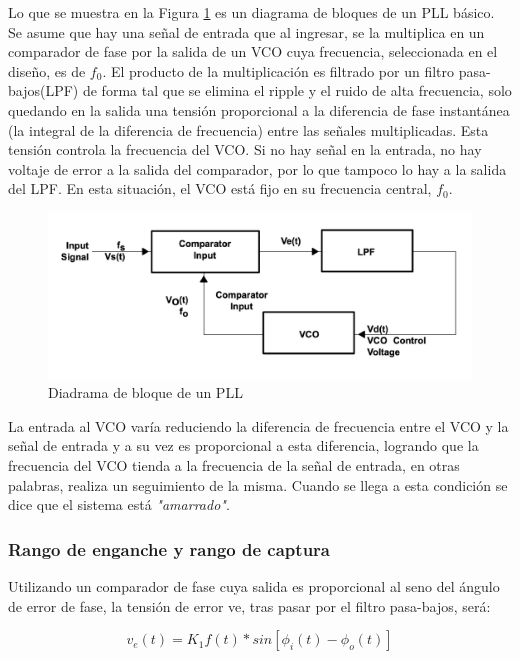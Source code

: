 Lo que se muestra en la Figura \ref{DiagramaBloquePLL} es un diagrama de bloques de un PLL básico. Se asume que hay una señal de entrada que al ingresar, se la multiplica en un comparador de fase por la salida de un VCO cuya frecuencia, seleccionada en el diseño, es de $f_0$. El producto de la multiplicación es filtrado por un filtro pasa-bajos(LPF) de forma tal que se elimina el ripple y el ruido de alta frecuencia, solo quedando en la salida una tensión proporcional a la diferencia de fase instantánea (la integral de la diferencia de frecuencia) entre las señales multiplicadas. Esta tensión controla la frecuencia del VCO. Si no hay señal en la entrada, no hay voltaje de error a la salida del comparador, por lo que tampoco lo hay a la salida del LPF. En esta situación, el VCO está fijo en su frecuencia central, $f_0$.


\begin{figure}[h!]
	\centering
	\includegraphics[width=1\textwidth]{../1. PLL/Imagenes/Diagrama bloque PLL.png}
	\caption{Diadrama de bloque de un PLL}
	\label{DiagramaBloquePLL}
\end{figure}

La entrada al VCO varía reduciendo la diferencia de frecuencia entre el VCO y la señal de entrada y a su vez es proporcional a esta diferencia, logrando que la frecuencia del VCO tienda a la frecuencia de la señal de entrada, en otras palabras, realiza un seguimiento de la misma. Cuando se llega a esta condición se dice que el sistema está \textit{"amarrado"}.

\subsubsection{Rango de enganche y rango de captura}

Utilizando un comparador de fase cuya salida es proporcional al seno del ángulo de error de fase, la tensión de error ve, tras pasar por el filtro pasa-bajos, será:

\begin{equation}
	v_e(t) = K_1 f(t)*sin[\phi_i(t)-\phi_o(t)]
	\label{EqVe}
\end{equation}

